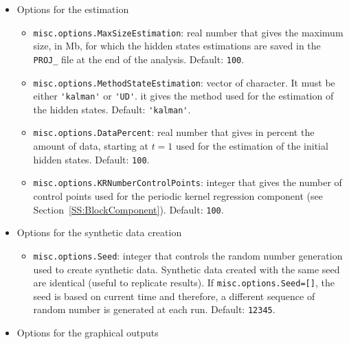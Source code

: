 \begin{itemize}
\item Options for the estimation

\begin{itemize}
\item \lstinline[basicstyle = \mlttfamily \small ]!misc.options.MaxSizeEstimation!: real number that gives the maximum size, in Mb, for which the hidden states estimations are saved in the \lstinline[basicstyle = \mlttfamily \small ]!PROJ_! file at the end of the analysis. Default: \lstinline[basicstyle = \mlttfamily \small ]!100!.
\item \lstinline[basicstyle = \mlttfamily \small ]!misc.options.MethodStateEstimation!: vector of character. It must be either \lstinline[basicstyle = \mlttfamily \small ]!'kalman'! or \lstinline[basicstyle = \mlttfamily \small ]!'UD'!. it gives the method used for the estimation of the hidden states. Default: \lstinline[basicstyle = \mlttfamily \small ]!'kalman'!.
\item \lstinline[basicstyle = \mlttfamily \small ]!misc.options.DataPercent!: real number that gives in percent the amount of data, starting at $t=1$ used for the estimation of the initial hidden states. Default: \lstinline[basicstyle = \mlttfamily \small ]!100!.
\item \lstinline[basicstyle = \mlttfamily \small ]!misc.options.KRNumberControlPoints!: integer that gives the number of control points used for the periodic kernel regression component (see Section~\ref{SS:BlockComponent}). Default: \lstinline[basicstyle = \mlttfamily \small ]!100!.
\end{itemize}


\item Options for the synthetic data creation

\begin{itemize}
\item \lstinline[basicstyle = \mlttfamily \small ]!misc.options.Seed!: integer that controls the random number generation used to create synthetic data. Synthetic data created with the same seed are identical (useful to replicate results). If  \lstinline[basicstyle = \mlttfamily \small ]!misc.options.Seed=[]!, the seed is based on current time and therefore, a different sequence of random number  is generated at each run. Default: \lstinline[basicstyle = \mlttfamily \small ]!12345!.
\end{itemize}

\item Options for the graphical outputs


\end{itemize}
